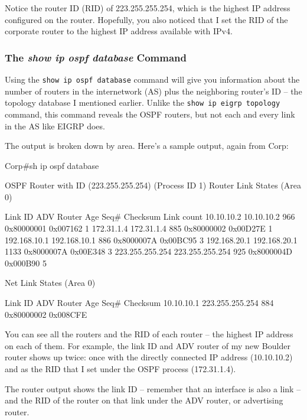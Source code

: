 Notice the router ID (RID) of 223.255.255.254, which is the highest IP
address configured on the router. Hopefully, you also noticed that I set
the RID of the corporate router to the highest IP address available with
IPv4.

\subsubsection[The \emph{show ip ospf database}
Command]{\texorpdfstring{\protect\hypertarget{c18.xhtmlux5cux23c18-sec-13}{}{}The
\emph{show ip ospf database}
Command}{The show ip ospf database Command}}

Using the \texttt{show\ ip\ ospf\ database} command will give you
information about the number of routers in the internetwork (AS) plus
the neighboring router's ID -- the topology database I mentioned earlier.
Unlike the \texttt{show\ ip\ eigrp\ topology} command, this command
reveals the OSPF routers, but not each and every link in the AS like
EIGRP does.

The output is broken down by area. Here's a sample output, again from
Corp:

\begin{cli}
Corp#sh ip ospf database

                OSPF Router with ID (223.255.255.254) (Process ID 1)
Router Link States (Area 0)

Link ID         ADV Router      Age         Seq#       Checksum Link count
10.10.10.2      10.10.10.2      966         0x80000001 0x007162 1
172.31.1.4      172.31.1.4      885         0x80000002 0x00D27E 1
192.168.10.1    192.168.10.1    886         0x8000007A 0x00BC95 3
192.168.20.1    192.168.20.1    1133        0x8000007A 0x00E348 3
223.255.255.254 223.255.255.254 925         0x8000004D 0x000B90 5

                Net Link States (Area 0)

Link ID         ADV Router      Age         Seq#       Checksum
10.10.10.1      223.255.255.254 884         0x80000002 0x008CFE
\end{cli}

\protect\hypertarget{c18.xhtmlux5cux23Page_768}{}{}You can see all the
routers and the RID of each router -- the highest IP address on each of
them. For example, the link ID and ADV router of my new Boulder router
shows up twice: once with the directly connected IP address (10.10.10.2)
and as the RID that I set under the OSPF process (172.31.1.4).

The router output shows the link ID -- remember that an interface is also
a link -- and the RID of the router on that link under the ADV router, or
advertising router.

